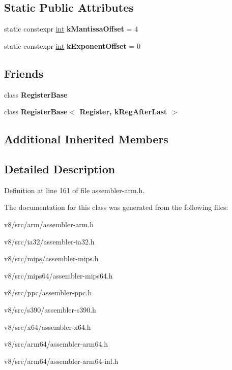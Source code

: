 \subsection*{Static Public Attributes}
\begin{DoxyCompactItemize}
\item 
\mbox{\label{classv8_1_1internal_1_1Register_a8195b5e37238aa3dcc33c1418b1eba08}} 
static constexpr \mbox{\hyperlink{classint}{int}} {\bfseries k\+Mantissa\+Offset} = 4
\item 
\mbox{\label{classv8_1_1internal_1_1Register_abc30e312466b5d2f8f081800a310d3a3}} 
static constexpr \mbox{\hyperlink{classint}{int}} {\bfseries k\+Exponent\+Offset} = 0
\end{DoxyCompactItemize}
\subsection*{Friends}
\begin{DoxyCompactItemize}
\item 
\mbox{\label{classv8_1_1internal_1_1Register_a960d84c54d6f69c7f2d3cf54e7fd6938}} 
class {\bfseries Register\+Base}
\item 
\mbox{\label{classv8_1_1internal_1_1Register_a0b22bb42af03fab7eba8f423b58af909}} 
class {\bfseries Register\+Base$<$ Register, k\+Reg\+After\+Last $>$}
\end{DoxyCompactItemize}
\subsection*{Additional Inherited Members}


\subsection{Detailed Description}


Definition at line 161 of file assembler-\/arm.\+h.



The documentation for this class was generated from the following files\+:\begin{DoxyCompactItemize}
\item 
v8/src/arm/assembler-\/arm.\+h\item 
v8/src/ia32/assembler-\/ia32.\+h\item 
v8/src/mips/assembler-\/mips.\+h\item 
v8/src/mips64/assembler-\/mips64.\+h\item 
v8/src/ppc/assembler-\/ppc.\+h\item 
v8/src/s390/assembler-\/s390.\+h\item 
v8/src/x64/assembler-\/x64.\+h\item 
v8/src/arm64/assembler-\/arm64.\+h\item 
v8/src/arm64/assembler-\/arm64-\/inl.\+h\end{DoxyCompactItemize}
